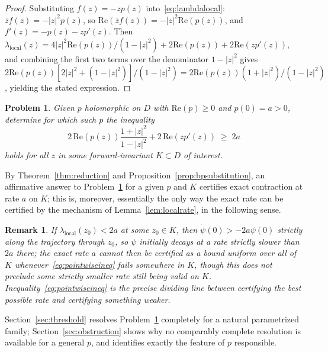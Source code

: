 \documentclass[pdflatex,sn-mathphys-num]{sn-jnl}%
\theoremstyle{thmstyleone}%
\theoremstyle{thmstyletwo}%
\newtheorem{remark}{Remark}%
\theoremstyle{thmstylethree}%
\newtheorem{problem}{Problem}
\begin{document}
\begin{proof}
Substituting $f(z)=-zp(z)$ into~\eqref{eq:lambdalocal}: $\bar zf(z)=-|z|^2p(z)$, so $\mathrm{Re}(\bar zf(z))=-|z|^2\mathrm{Re}(p(z))$, and $f'(z)=-p(z)-zp'(z)$. Then $\lambda_{\mathrm{local}}(z)=4|z|^2\mathrm{Re}(p(z))/(1-|z|^2)+2\mathrm{Re}(p(z))+2\mathrm{Re}(zp'(z))$, and combining the first two terms over the denominator $1-|z|^2$ gives $2\mathrm{Re}(p(z))[2|z|^2+(1-|z|^2)]/(1-|z|^2)=2\mathrm{Re}(p(z))(1+|z|^2)/(1-|z|^2)$, yielding the stated expression.
\end{proof}

\begin{problem}
\label{prob:pointwise}
Given $p$ holomorphic on $D$ with $\mathrm{Re}(p)\ge0$ and $p(0)=a>0$, determine for which such $p$ the inequality
\begin{equation}
2\,\mathrm{Re}(p(z))\frac{1+|z|^2}{1-|z|^2} + 2\,\mathrm{Re}(zp'(z)) \;\ge\; 2a \label{eq:pointwiseineq}
\end{equation}
holds for all $z$ in some forward-invariant $K\subset D$ of interest.
\end{problem}

By Theorem~\ref{thm:reduction} and Proposition~\ref{prop:bpsubstitution}, an affirmative answer to Problem~\ref{prob:pointwise} for a given $p$ and $K$ certifies exact contraction at rate $a$ on $K$; this is, moreover, essentially the only way the exact rate can be certified by the mechanism of Lemma~\ref{lem:localrate}, in the following sense.

\begin{remark}
\label{rem:necessity}
If $\lambda_{\mathrm{local}}(z_0)<2a$ at some $z_0\in K$, then $\dot\psi(0)>-2a\psi(0)$ strictly along the trajectory through $z_0$, so $\psi$ initially decays at a rate strictly slower than $2a$ there; the exact rate $a$ cannot then be certified as a bound uniform over all of $K$ whenever~\eqref{eq:pointwiseineq} fails somewhere in $K$, though this does not preclude some strictly smaller rate still being valid on $K$. Inequality~\eqref{eq:pointwiseineq} is the precise dividing line between certifying the best possible rate and certifying something weaker.
\end{remark}

Section~\ref{sec:threshold} resolves Problem~\ref{prob:pointwise} completely for a natural parametrized family; Section~\ref{sec:obstruction} shows why no comparably complete resolution is available for a general $p$, and identifies exactly the feature of $p$ responsible.
\end{document}
